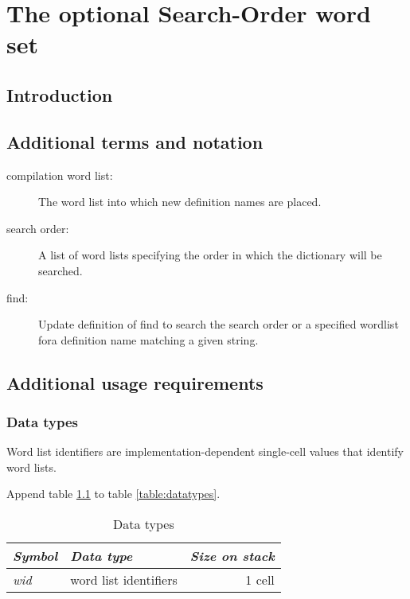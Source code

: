 
\chapter{The optional Search-Order word set} %

\section{Introduction} %

\section{Additional terms and notation} %
\label{search:terms}

\begin{description}
\item[compilation word list:]
	The word list into which new definition names are placed.

\item[search order:]
	A list of word lists specifying the order in which the
	dictionary will be searched.

\item[find:]
	Update  definition of find to search the search
	order or a specified wordlist fora definition name matching a given
	string.
\end{description}

\section{Additional usage requirements} %

\subsection{Data types} %

Word list identifiers are implementation-dependent single-cell
values that identify word lists.

Append table \ref{search:types} to table \ref{table:datatypes}.

\begin{table}[h]
  \begin{center}
	\caption{Data types}
	\label{search:types}
	\begin{tabular}{llr}
	\hline\hline
	\emph{Symbol} & \emph{Data type} & \emph{Size on stack} \\
	\hline
	\emph{wid}		& word list identifiers	& 1 cell \\
	\hline\hline
	\end{tabular}
  \end{center}
\end{table}


